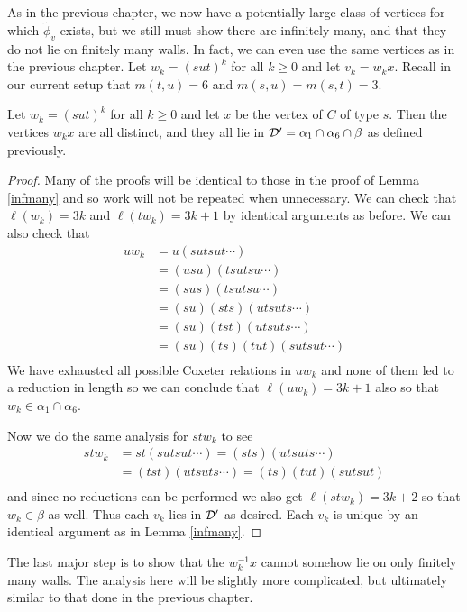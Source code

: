\documentclass[class=book, crop=false]{standalone}
\begin{document}
As in the previous chapter, we now have a potentially large class of vertices for which $\tilde{\phi}_v$ exists, but we still must show there are infinitely many, and that they do not lie on finitely many walls. In fact, we can even use the same vertices as in the previous chapter. Let $w_k=(sut)^k$ for all $k\ge 0$ and let $v_k=w_kx.$ Recall in our current setup that $m(t,u)=6$ and $m(s,u)=m(s,t)=3.$ 

\begin{lemma}
	\label{336f2infmany}
	Let $w_k=(sut)^k$ for all $k\ge 0$ and let $x$ be the vertex of $C$ of type $s.$ Then the vertices $w_kx$ are all distinct, and they all lie in $\mathcal{D}'=\alpha_1\cap \alpha_6\cap\beta$ as defined previously.
\end{lemma}
\begin{proof}
	Many of the proofs will be identical to those in the proof of Lemma \ref{infmany} and so work will not be repeated when unnecessary. We can check that $\ell(w_k)=3k$ and $\ell(tw_k)=3k+1$ by identical arguments as before. We can also check that
	\begin{align*}
		uw_k&=u(sutsut\cdots)\\
		    &=(usu)(tsutsu\cdots)\\
		    &=(sus)(tsutsu\cdots)\\
		    &=(su)(sts)(utsuts\cdots)\\
		    &=(su)(tst)(utsuts\cdots)\\
		    &=(su)(ts)(tut)(sutsut\cdots)\\
	\end{align*}
We have exhausted all possible Coxeter relations in $uw_k$ and none of them led to a reduction in length so we can conclude that $\ell(uw_k)=3k+1$ also so that $w_k\in \alpha_1\cap \alpha_6.$

Now we do the same analysis for $stw_k$ to see
\begin{align*}
	stw_k&=st(sutsut\cdots)=(sts)(utsuts\cdots)\\
	     &=(tst)(utsuts\cdots)=(ts)(tut)(sutsut)\\
\end{align*}
and since no reductions can be performed we also get $\ell(stw_k)=3k+2$ so that $w_k\in \beta$ as well. Thus each $v_k$ lies in $\mathcal{D}'$ as desired. Each $v_k$ is unique by an identical argument as in Lemma \ref{infmany}.
\end{proof}

The last major step is to show that the $w_k^{-1}x$ cannot somehow lie on only finitely many walls. The analysis here will be slightly more complicated, but ultimately similar to that done in the previous chapter.
\end{document}
